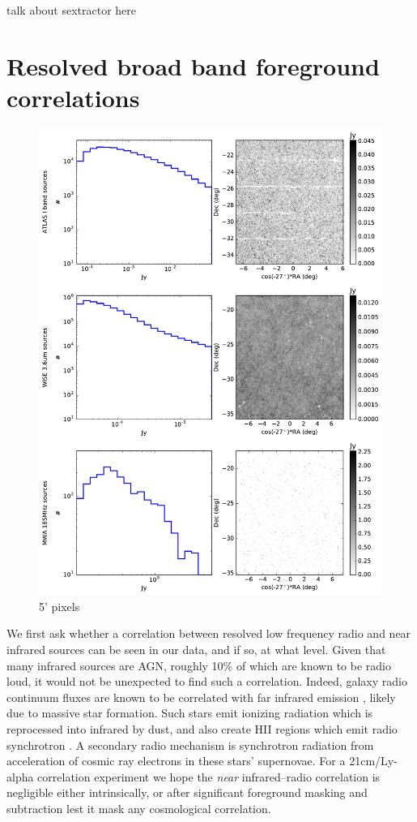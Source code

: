 \documentclass{emulateapj}
\begin{document}
talk about sextractor here


\section{Resolved broad band foreground correlations}


\begin{figure}[h]
\centering
\includegraphics[width=6in]{images/catalog_hists_and_images.pdf}
\caption{5' pixels}
\label{fig:cataloghistsandimages}
\end{figure}


We first ask whether a correlation between resolved low frequency radio and near infrared sources can be seen in our data, and if so, at what level. Given that many infrared sources are AGN, roughly 10\% of which are known to be radio loud, it would not be unexpected to find such a correlation. Indeed, galaxy radio continuum fluxes are known to be correlated with far infrared emission \citep{helou85,dejong85,yun01}, likely due to massive star formation. Such stars emit ionizing radiation which is reprocessed into infrared by dust, and also create HII regions which emit radio synchrotron \citep{xu94}. A secondary radio mechanism is synchrotron radiation from acceleration of cosmic ray electrons in these stars' supernovae. For a 21cm/Ly-alpha correlation experiment we hope the \textit{near} infrared--radio correlation is negligible either intrinsically, or after significant foreground masking and subtraction lest it mask any cosmological correlation.
\end{document}
